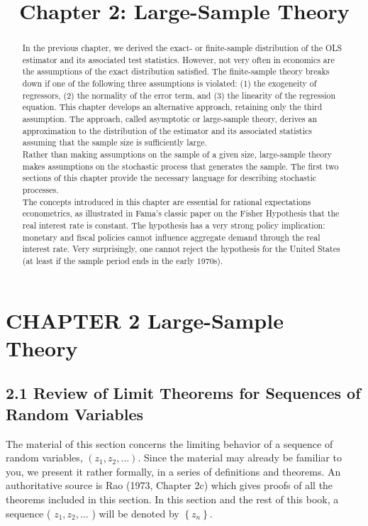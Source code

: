 \documentclass[10pt]{article}
\title{Chapter 2: Large-Sample Theory}
\author{}
\date{}
\begin{document}
\maketitle

\section*{CHAPTER 2 Large-Sample Theory}
\begin{abstract}
In the previous chapter, we derived the exact- or finite-sample distribution of the OLS estimator and its associated test statistics. However, not very often in economics are the assumptions of the exact distribution satisfied. The finite-sample theory breaks down if one of the following three assumptions is violated: (1) the exogeneity of regressors, (2) the normality of the error term, and (3) the linearity of the regression equation. This chapter develops an alternative approach, retaining only the third assumption. The approach, called asymptotic or large-sample theory, derives an approximation to the distribution of the estimator and its associated statistics assuming that the sample size is sufficiently large.\\
Rather than making assumptions on the sample of a given size, large-sample theory makes assumptions on the stochastic process that generates the sample. The first two sections of this chapter provide the necessary language for describing stochastic processes.\\
The concepts introduced in this chapter are essential for rational expectations econometrics, as illustrated in Fama's classic paper on the Fisher Hypothesis that the real interest rate is constant. The hypothesis has a very strong policy implication: monetary and fiscal policies cannot influence aggregate demand through the real interest rate. Very surprisingly, one cannot reject the hypothesis for the United States (at least if the sample period ends in the early 1970s).
\end{abstract}

\subsection*{2.1 Review of Limit Theorems for Sequences of Random Variables}
The material of this section concerns the limiting behavior of a sequence of random variables, $\left(z_{1}, z_{2}, \ldots\right)$. Since the material may already be familiar to you, we present it rather formally, in a series of definitions and theorems. An authoritative source is Rao (1973, Chapter 2c) which gives proofs of all the theorems included in this section. In this section and the rest of this book, a sequence ( $z_{1}, z_{2}, \ldots$ ) will be denoted by $\left\{z_{n}\right\}$.
\end{document}
